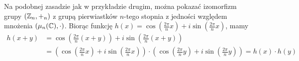 Na podobnej zasadzie jak w przykładzie drugim, można pokazać izomorfizm grupy $(\mathbb Z_n, +_n)$ z grupą pierwiastków $n$-tego stopnia z jedności względem mnożenia $(\mu_n(\mathbb C), \cdot)$. Biorąc funkcję $h(x) = \cos(\frac{2\pi}{n}x) + i\sin(\frac{2\pi}{n}x)$, mamy
\begin{align*} h(x + y) &= \cos(\tfrac{2\pi}{n}(x + y)) + i\sin(\tfrac{2\pi}{n}(x + y)) \\
    &= \left(\cos(\tfrac{2\pi}{n}x) + i\sin(\tfrac{2\pi}{n}x)\right) \cdot \left(\cos(\tfrac{2\pi}{n}y) + i\sin(\tfrac{2\pi}{n}y)\right) = h(x) \cdot h(y)\end{align*}
